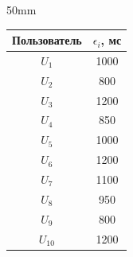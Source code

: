 \begin{floatingfigure}{50mm}


{\small %


\vspace*{-14pt}


\begin{center}




    \label{tab:epsilon_aut}


        \vspace*{2ex}


        


        \tabcolsep=14pt


         \begin{tabular}{|c|c|}


        \hline


Пользователь &$\epsilon_i$, мс\\


\hline


$U_1$&1000\\


$U_2$&\hphantom{9}800\\


$U_3$&1200\\


$U_4$&\hphantom{9}850\\


$U_5$&1000\\


$U_6$&1200\\


$U_7$&1100\\


$U_8$&\hphantom{9}950\\


$U_9$&\hphantom{9}800\\


\hphantom{$_1$}$U_{10}$&1200\\


        \hline              


                \end{tabular}


\end{center}}




{\small %


\begin{center}



\end{center}}
\end{floatingfigure}
